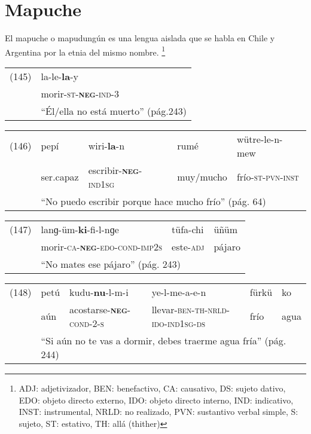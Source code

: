 \section*{Mapuche}

\noindent El mapuche o mapudungún es una lengua aislada que se habla en Chile y Argentina por la etnia del mismo nombre.
\footnote{ADJ: adjetivizador, BEN: benefactivo, CA: causativo, DS: sujeto dativo, EDO: objeto directo externo, IDO: objeto directo interno, IND: indicativo, INST: instrumental, NRLD: no realizado, PVN: sustantivo verbal simple, S: sujeto, ST: estativo, TH: allá (thither) }
\vspace{0.5cm}

{\setmainfont{Charis SIL} 

\begin{tabular}{ll}
(145) & la-le-\textbf{la}-y \\
& morir-\textsc{st-\textbf{neg}-ind-3}\\
& ``Él/ella no está muerto'' (pág.243)
\end{tabular} \vspace{0.5cm}

\begin{tabular}{lllll}
(146) & pepí & wiri-\textbf{la}-n & rumé & wütre-le-n-mew \\
& ser.capaz & escribir-\textsc{\textbf{neg}-ind1sg} & muy/mucho & frío-\textsc{st-pvn-inst} \\
& \multicolumn{4}{l}{``No puedo escribir porque hace mucho frío'' (pág. 64)}
\end{tabular} \vspace{0.5cm}

\begin{tabular}{llll}
(147) & lanɡ-üm-\textbf{ki}-fi-l-nɡe & tüfa-chi & üñüm \\
& morir-\textsc{ca-\textbf{neg}-edo-cond-imp2s} & este-\textsc{adj} & pájaro \\
& \multicolumn{3}{l}{``No mates ese pájaro'' (pág. 243)}
\end{tabular} \vspace{0.5cm}

{\footnotesize
\begin{tabular}{llllll}
(148) & petú & kudu-\textbf{nu}-l-m-i & ye-l-me-a-e-n & fürkü & ko \\
& aún & acostarse-\textsc{\textbf{neg}-cond-2-s} & llevar-\textsc{ben-th-nrld-ido-ind1sg-ds} & frío & agua \\
& \multicolumn{5}{l}{``Si aún no te vas a dormir, debes traerme agua fría'' (pág. 244)}
\end{tabular} \vspace{0.5cm}}

}
